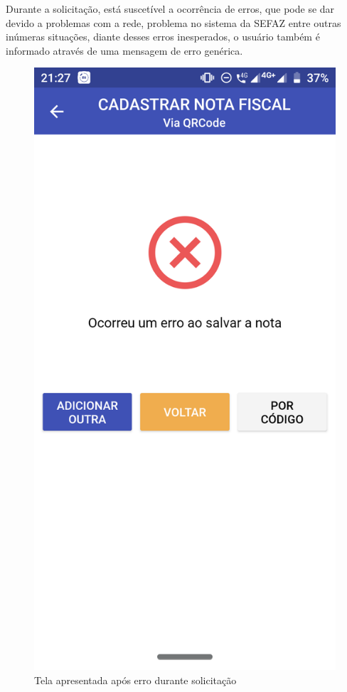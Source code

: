 \newpage
Durante a solicitação, está suscetível a ocorrência de erros, que pode se dar devido a problemas com a rede, problema no sistema da SEFAZ entre outras inúmeras situações, diante desses erros inesperados, o usuário também é informado através de uma mensagem de erro genérica.

\begin{figure}[h]
    \centering
    \includegraphics[scale=0.15]{tcc/figures/app/app_codigo_qrcode_erro.png}
    \caption{Tela apresentada após erro durante solicitação}
    \label{appQRCodeErroFig}
\end{figure}

